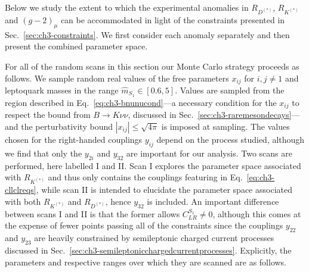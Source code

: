 Below we study the extent to which the experimental anomalies in $R_{D^{(*)}}$,
$R_{K^{(*)}}$ and $(g-2)_\mu$ can be accommodated in light of the constraints presented
in Sec.~\ref{sec:ch3-constraints}. We first consider each anomaly separately and
then present the combined parameter space.

For all of the random scans in this section our Monte Carlo strategy proceeds as
follows. We sample random real values of the free parameters $x_{ij}$ for $i,j
\neq 1$ and leptoquark masses in the range $\hat{m}_{S_{1}} \in [0.6, 5]$. Values
are sampled from the region described in Eq.~\eqref{eq:ch3-bnunucond}---a necessary
condition for the $x_{ij}$ to respect the bound from $B \to K\nu\nu$, discussed
in Sec.~\ref{sec:ch3-raremesondecays}---and the perturbativity bound $|x_{ij}| \leq
\sqrt{4\pi}$ is imposed at sampling. The values chosen for the right-handed
couplings $y_{ij}$ depend on the process studied, although we find that only the
$y_{2i}$ and $y_{32}$ are important for our analysis. Two scans are performed,
here labelled I and II. Scan I explores the parameter space associated with
$R_{K^{(*)}}$ and thus only contains the couplings featuring in
Eq.~\eqref{eq:ch3-cllclreqs}, while scan II is intended to elucidate the parameter
space associated with both $R_{K^{(*)}}$ and $R_{D^{(*)}}$, hence $y_{32}$ is
included. An important difference between scans I and II is that the former
allows $C_{LR}^{S_{1}} \neq 0$, although this comes at the expense of fewer points
passing all of the constraints since the couplings $y_{22}$ and $y_{23}$ are
heavily constrained by semileptonic charged current processes discussed in
Sec.~\ref{sec:ch3-semileptonicchargedcurrentprocesses}. Explicitly, the parameters
and respective ranges over which they are scanned are as follows.
